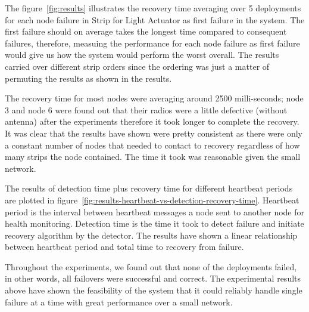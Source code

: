 The figure~\ref{fig:results} illustrates the recovery time averaging over
5 deployments for each node failure in Strip for Light Actuator as first failure
in the system. The first failure should on average takes the longest time
compared to consequent failures, therefore, measuing the performance for each
node failure as first failure would give us how the system would perform the
worst overall. The results carried over different strip orders since the
ordering was just a matter of permuting the results as shown in the results.

The recovery time for most nodes were averaging around 2500 milli-seconds; node
3 and node 6 were found out that their radios were a little defective (without
antenna) after the experiments therefore it took longer to complete the
recovery. It was clear that the results have shown were pretty consistent as
there were only a constant number of nodes that needed to contact to recovery
regardless of how many strips the node contained. The time it took was
reasonable given the small network. 

The results of detection time plus recovery time for different heartbeat
periods are plotted
in figure~\ref{fig:results-heartbeat-vs-detection-recovery-time}. Heartbeat
period is the interval between heartbeat messages a node sent to
another node for health monitoring. Detection time is the time it took to detect
failure and initiate recovery algorithm by the detector.
The results have shown a linear relationship between heartbeat
period and total time to recovery from failure. 

Throughout the experiments, we found out that none of the deployments failed, in
other words, all failovers were successful and correct. The experimental results
above have shown the feasibility of the system that it could reliably handle
single failure at a time with great performance over a small network.




